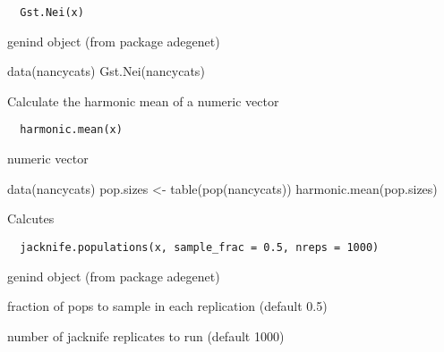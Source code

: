 \documentclass[letterpaper]{book}
\begin{document}
%
\begin{Usage}
\begin{verbatim}
  Gst.Nei(x)
\end{verbatim}
\end{Usage}
%
\begin{Arguments}
\begin{ldescription}
\item[\code{x}] genind object (from package adegenet)
\end{ldescription}
\end{Arguments}
%
\begin{Examples}
\begin{ExampleCode}
data(nancycats)
Gst.Nei(nancycats)
\end{ExampleCode}
\end{Examples}
%
\begin{Description}\relax
Calculate the harmonic mean of a numeric vector
\end{Description}
%
\begin{Usage}
\begin{verbatim}
  harmonic.mean(x)
\end{verbatim}
\end{Usage}
%
\begin{Arguments}
\begin{ldescription}
\item[\code{x}] numeric vector
\end{ldescription}
\end{Arguments}
%
\begin{Examples}
\begin{ExampleCode}
data(nancycats)
pop.sizes <- table(pop(nancycats))
harmonic.mean(pop.sizes)
\end{ExampleCode}
\end{Examples}
%
\begin{Description}\relax
Calcutes
\end{Description}
%
\begin{Usage}
\begin{verbatim}
  jacknife.populations(x, sample_frac = 0.5, nreps = 1000)
\end{verbatim}
\end{Usage}
%
\begin{Arguments}
\begin{ldescription}
\item[\code{x}] genind object (from package adegenet)

\item[\code{sample\_frac}] fraction of pops to sample in each
replication (default 0.5)

\item[\code{nreps}] number of jacknife replicates to run
(default 1000)
\end{ldescription}
\end{Arguments}
\end{document}
